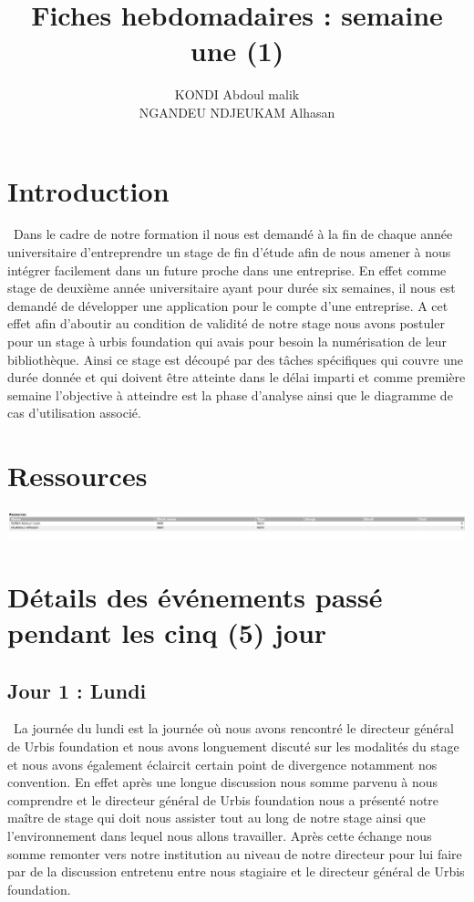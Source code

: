 \documentclass[12pt,a4paper]{article}
\author{KONDI Abdoul malik \\ NGANDEU NDJEUKAM Alhasan}
\title{Fiches hebdomadaires : semaine une (1)}
\begin{document}
\maketitle
\tableofcontents
\newpage

\section{Introduction}
\ Dans le cadre de notre formation il nous est demandé à la fin de chaque année universitaire d’entreprendre un stage de fin d’étude afin de nous amener à nous intégrer facilement dans un future proche dans une entreprise. En effet comme stage de deuxième année universitaire ayant pour durée six semaines, il nous est demandé de développer une application pour le compte d’une entreprise. A cet effet afin d’aboutir au condition de validité de notre stage nous avons postuler pour un stage à urbis foundation qui avais pour besoin la numérisation de leur bibliothèque. Ainsi ce stage est découpé par des tâches spécifiques qui couvre une durée donnée et qui doivent être atteinte dans le délai imparti et comme première semaine l’objective à atteindre est la phase d’analyse ainsi que le diagramme de cas d’utilisation associé.
\section{Ressources}
\includegraphics[scale=0.25]{images/resources.png}
\section{Détails des événements passé pendant les cinq (5) jour}
\subsection{Jour 1 : Lundi}

\ La journée du lundi est la journée où nous avons rencontré le directeur général de Urbis foundation et nous avons longuement discuté sur les modalités du stage et nous avons également éclaircit certain point de divergence notamment nos convention. En effet après une longue discussion nous somme parvenu à nous comprendre et le directeur général de Urbis foundation nous a présenté notre maître de stage qui doit nous assister tout au long de notre stage ainsi que l’environnement dans lequel nous allons travailler. Après cette échange nous somme remonter vers notre institution au niveau de notre directeur pour lui faire par de la discussion entretenu entre nous stagiaire et le directeur général de Urbis foundation. 
\end{document}
